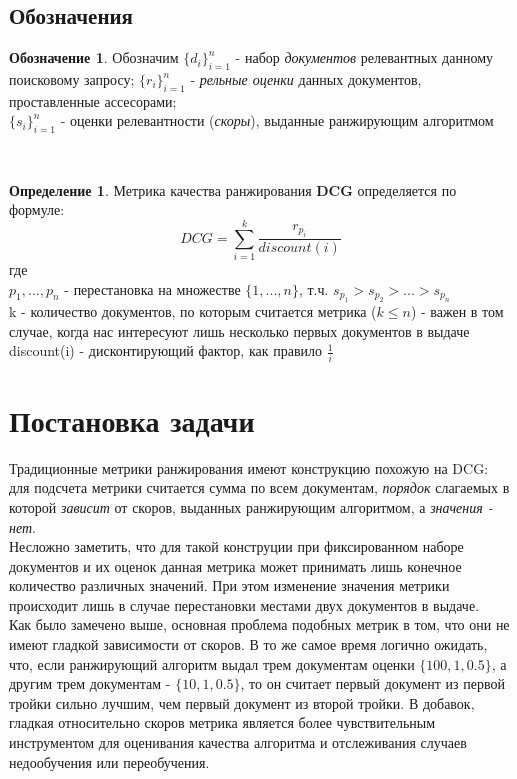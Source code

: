 \documentclass[12pt,a4paper]{amsart}
\theoremstyle{definition}
\newtheorem{definition}{Определение}[section]
\theoremstyle{definition}
\newtheorem{designation}{Обозначение}[section]
\newcommand{\Sum}{\sum\limits}
\renewcommand\i{\textit}
\renewcommand\b{\textbf}
\begin{document}
\subsection{Обозначения}
\begin{designation}
Обозначим $\{d_i\}_{i=1}^n$ - набор \i{документов} релевантных данному поисковому запросу; 
$\{r_i\}_{i=1}^n$ - \i{рельные оценки} данных документов, проставленные ассесорами; \\
$\{s_i\}_{i=1}^n$ - оценки релевантности (\i{скоры}), выданные ранжирующим алгоритмом
\end{designation}

~\\

\begin{definition}
Метрика качества ранжирования \b{DCG} определяется по формуле:
$$DCG = \Sum_{i=1}^k \frac{r_{p_i}}{discount(i)}$$
где \\
$p_1,...,p_n$ - перестановка на множестве $\{1,...,n\}$, т.ч. ${s_{p_1} > s_{p_2} > ... > s_{p_n}}$ \\
k - количество документов, по которым считается метрика ($k \le n$) - важен в том случае, когда нас интересуют лишь несколько первых документов в выдаче \\
discount(i) - дисконтирующий фактор, как правило $\frac{1}{i}$ \\
\end{definition}

\newpage
\section{Постановка задачи}

Традиционные метрики ранжирования имеют конструкцию похожую на DCG: для подсчета метрики считается сумма по всем документам, \i{порядок} слагаемых в которой \i{зависит} от скоров, выданных ранжирующим алгоритмом, а \i{значения - нет}.\\


Несложно заметить, что для такой конструции при фиксированном наборе документов и их оценок данная метрика может принимать лишь конечное количество различных значений. При этом изменение значения метрики происходит лишь в случае перестановки местами двух документов в выдаче.\\

Как было замечено выше, основная проблема подобных метрик в том, что они не имеют гладкой зависимости от скоров. В то же самое время логично ожидать, что, если ранжирующий алгоритм выдал трем документам оценки $\{100, 1, 0.5\}$, а другим трем документам - $\{10, 1, 0.5\}$, то он считает первый документ из первой тройки сильно лучшим, чем первый документ из второй тройки. В добавок, гладкая относительно скоров метрика является более чувствительным инструментом для оценивания качества алгоритма и отслеживания случаев недообучения или переобучения.\\
\end{document}
